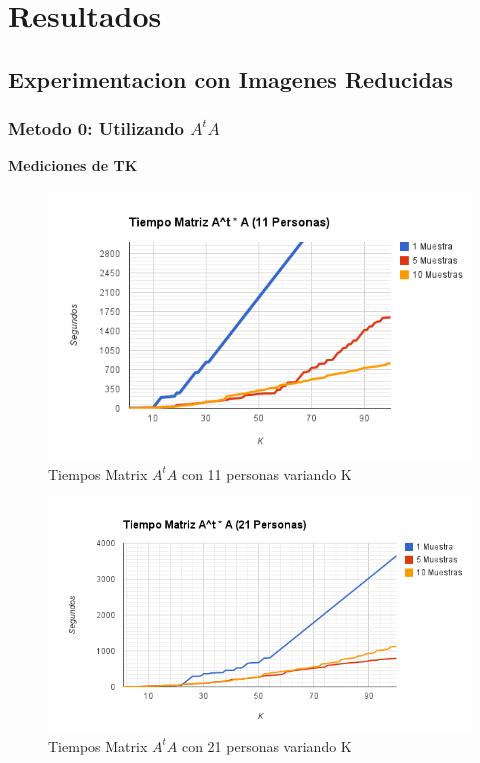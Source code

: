 \section{Resultados}
\subsection{Experimentacion con Imagenes Reducidas}
\subsubsection{Metodo 0: Utilizando $A^tA$}
\textbf{Mediciones de TK}

\begin{figure}[H]
\includegraphics[width=1\textwidth]{img/image1.png}
     \caption{Tiempos Matrix $A^tA$ con 11 personas variando K}
     \label{fig:figura1}
\end{figure}

\begin{figure}[H]
\includegraphics[width=1\textwidth]{img/image2.png}
     \caption{Tiempos Matrix $A^tA$ con 21 personas variando K}
     \label{fig:figura1}
\end{figure}


